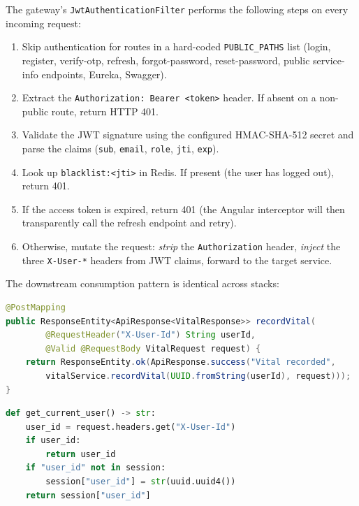 \documentclass[12pt]{caltech_thesis}
\begin{document}
The gateway's \texttt{JwtAuthenticationFilter} performs the following steps
on every incoming request:
\begin{enumerate}
    \item Skip authentication for routes in a hard-coded \texttt{PUBLIC\_PATHS}
    list (login, register, verify-otp, refresh, forgot-password,
    reset-password, public service-info endpoints, Eureka, Swagger).
    \item Extract the \texttt{Authorization: Bearer <token>} header. If
    absent on a non-public route, return HTTP 401.
    \item Validate the JWT signature using the configured HMAC-SHA-512
    secret and parse the claims (\texttt{sub}, \texttt{email}, \texttt{role},
    \texttt{jti}, \texttt{exp}).
    \item Look up \texttt{blacklist:<jti>} in Redis. If present (the user
    has logged out), return 401.
    \item If the access token is expired, return 401 (the Angular
    interceptor will then transparently call the refresh endpoint and retry).
    \item Otherwise, mutate the request: \textit{strip} the
    \texttt{Authorization} header, \textit{inject} the three
    \texttt{X-User-*} headers from JWT claims, forward to the target
    service.
\end{enumerate}

The downstream consumption pattern is identical across stacks:

\begin{lstlisting}[language=Java,caption={Java service controllers read \texttt{X-User-Id} as a method parameter.}]
@PostMapping
public ResponseEntity<ApiResponse<VitalResponse>> recordVital(
        @RequestHeader("X-User-Id") String userId,
        @Valid @RequestBody VitalRequest request) {
    return ResponseEntity.ok(ApiResponse.success("Vital recorded",
        vitalService.recordVital(UUID.fromString(userId), request)));
}
\end{lstlisting}

\begin{lstlisting}[language=Python,caption={Python chatbot service uses an identical header in \texttt{get\_current\_user()}.}]
def get_current_user() -> str:
    user_id = request.headers.get("X-User-Id")
    if user_id:
        return user_id
    if "user_id" not in session:
        session["user_id"] = str(uuid.uuid4())
    return session["user_id"]
\end{lstlisting}
\end{document}
